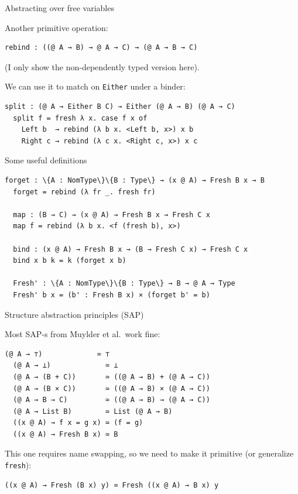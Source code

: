 \documentclass[dvipsnames,aspectratio=169]{beamer}
\newcommand{\vsp}{\vspace{1em}}
\theoremstyle{remark}
\begin{document}
\begin{frame}[fragile]{Abstracting over free variables}

Another primitive operation:
\begin{Verbatim}[commandchars=\\\{\}]
  rebind : ((@ A → B) → @ A → C) → (@ A → B → C)
\end{Verbatim}
(I only show the non-dependently typed version here).
\vsp

We can use it to match on \texttt{Either} under a binder:
\vsp
\begin{Verbatim}[commandchars=\\\{\}]
  split : (@ A → Either B C) → Either (@ A → B) (@ A → C)
  split f = fresh λ x. case f x of
    Left b  → rebind (λ b x. <Left b, x>) x b
    Right c → rebind (λ c x. <Right c, x>) x c
\end{Verbatim}
\vsp

\end{frame}
\begin{frame}[fragile]{Some useful definitions}

\begin{Verbatim}[commandchars=\\\{\}]
  forget : \{A : NomType\}\{B : Type\} → (x @ A) → Fresh B x → B
  forget = rebind (λ fr _. fresh fr)

  map : (B → C) → (x @ A) → Fresh B x → Fresh C x
  map f = rebind (λ b x. <f (fresh b), x>)

  bind : (x @ A) → Fresh B x → (B → Fresh C x) → Fresh C x
  bind x b k = k (forget x b)

  Fresh' : \{A : NomType\}\{B : Type\} → B → @ A → Type
  Fresh' b x = (b' : Fresh B x) × (forget b' = b)
\end{Verbatim}
\end{frame}

\begin{frame}[fragile]{Structure abstraction principles (SAP)}

Most SAP-s from Muylder et al.\ work fine:
\begin{Verbatim}[commandchars=\\\{\}]
  (@ A → ⊤)             ≃ ⊤
  (@ A → ⊥)             ≃ ⊥
  (@ A → (B + C))       ≃ ((@ A → B) + (@ A → C))
  (@ A → (B × C))       ≃ ((@ A → B) × (@ A → C))
  (@ A → B → C)         ≃ ((@ A → B) → (@ A → C))
  (@ A → List B)        ≃ List (@ A → B)
  ((x @ A) → f x = g x) ≃ (f = g)
  ((x @ A) → Fresh B x) ≃ B
\end{Verbatim}

\vsp
This one requires name swapping, so we need to make it primitive (or generalize \texttt{fresh}):

\begin{Verbatim}[commandchars=\\\{\}]
  ((x @ A) → Fresh (B x) y) ≃ Fresh ((x @ A) → B x) y
\end{Verbatim}
\end{frame}
\end{document}
